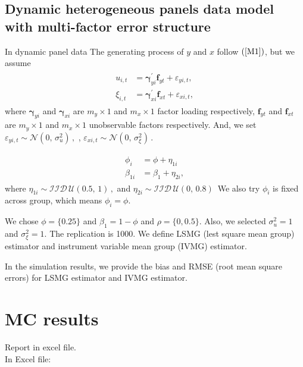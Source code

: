 \documentclass[12pt,a4paper,hyperref]{article}
\begin{document}
\subsection{Dynamic heterogeneous panels data model with multi-factor error structure }
In dynamic panel data 
The generating process of $y$ and $x$ follow $(\ref{M1})$, but we assume
\begin{align}
\begin{split}
u_{i,t}&=\boldsymbol{\gamma}^{'}_{yi}\boldsymbol{f}_{yt}+\varepsilon_{yi,t}, \\
\xi_{i,t}&=\boldsymbol{\gamma}^{'}_{xi}\boldsymbol{f}_{xt}+\varepsilon_{xi,t},
\end{split}
\end{align}
where $\boldsymbol{\gamma}_{yi}$ and $\boldsymbol{\gamma}_{xi}$ are $m_{y}\times 1$ and $m_{x}\times 1$
 factor loading respectively, $\boldsymbol{f}_{yt}$  and  $\boldsymbol{f}_{xt}$ are  $m_{y}\times 1$ and $m_{x}\times 1$ unobservable factors respectively. And, we set  $\varepsilon_{yi,t}\sim \mathcal{N}(0,\,\sigma_{u}^{2})\,,$ , $\varepsilon_{xi,t}\sim \mathcal{N}(0,\,\sigma_{\xi}^{2})\,.$

\begin{align}
\begin{split}
\phi_{i}&= \phi+\eta_{1i}    \\
\beta_{1i}&= \beta_{1}+\eta_{2i},
\end{split}
\end{align}
where $\eta_{1i}\sim \mathcal{IID}\,\mathcal{U}(0.5,\, 1)\,,$ and $\eta_{2i}\sim \mathcal{IID}\,\mathcal{U}(0,\, 0.8)\,$
We also try $\phi_{i}$ is fixed across group, which means $\phi_{i}= \phi$.

We chose $\phi=\{0.25 \}$ and $\beta_{1}=1-\phi$ and $\rho=\{0, 0.5 \}$. Also, we selected $\sigma_{u}^{2}=1$ and $\sigma_{\xi}^{2}=1$. The replication is 1000.
We define LSMG (lest square mean group) estimator and instrument variable mean group (IVMG) estimator.


In the simulation results, we provide the bias and RMSE (root mean square errors) for LSMG estimator and IVMG estimator.






\section{MC results}
Report in excel file. \\
In Excel file:\\
\end{document}
